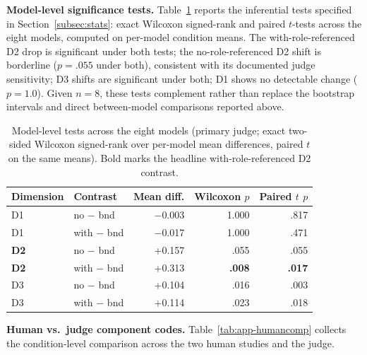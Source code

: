 \documentclass[11pt]{article}
\begin{document}
\textbf{Model-level significance tests.} Table~\ref{tab:app-tests} reports the inferential tests specified in Section~\ref{subsec:stats}: exact Wilcoxon signed-rank and paired $t$-tests across the eight models, computed on per-model condition means. The with-role-referenced D2 drop is significant under both tests; the no-role-referenced D2 shift is borderline ($p = .055$ under both), consistent with its documented judge sensitivity; D3 shifts are significant under both; D1 shows no detectable change ($p = 1.0$). Given $n = 8$, these tests complement rather than replace the bootstrap intervals and direct between-model comparisons reported above.

\begin{table}[h]
\centering
\scriptsize
\setlength{\tabcolsep}{4pt}
\begin{tabular}{@{}l l r r r@{}}
\toprule
Dimension & Contrast & Mean diff. & Wilcoxon $p$ & Paired $t$ $p$ \\
\midrule
D1 & no $-$ bnd & $-$0.003 & 1.000 & .817 \\
D1 & with $-$ bnd & $-$0.017 & 1.000 & .471 \\
\textbf{D2} & no $-$ bnd & +0.157 & .055 & .055 \\
\textbf{D2} & with $-$ bnd & +0.313 & \textbf{.008} & \textbf{.017} \\
D3 & no $-$ bnd & +0.104 & .016 & .003 \\
D3 & with $-$ bnd & +0.114 & .023 & .018 \\
\bottomrule
\end{tabular}
\caption{Model-level tests across the eight models (primary judge; exact two-sided Wilcoxon signed-rank over per-model mean differences, paired $t$ on the same means). Bold marks the headline with-role-referenced D2 contrast.}
\label{tab:app-tests}
\end{table}

\textbf{Human vs.\ judge component codes.} Table~\ref{tab:app-humancomp} collects the condition-level comparison across the two human studies and the judge.
\end{document}
